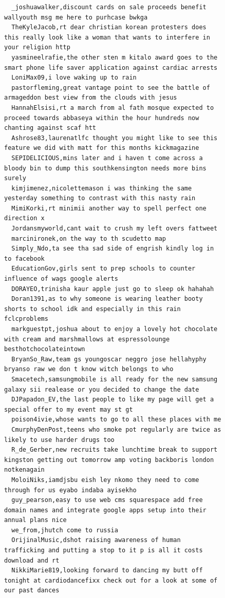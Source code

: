 \begin{figure}[htpb]
\begin{verbatim}
  _joshuawalker,discount cards on sale proceeds benefit wallyouth msg me here to purhcase bwkga
  TheKyleJacob,rt dear christian korean protesters does this really look like a woman that wants to interfere in your religion http
  yasmineelrafie,the other sten m kitalo award goes to the smart phone life saver application against cardiac arrests
  LoniMax09,i love waking up to rain
  pastorfleming,great vantage point to see the battle of armageddon best view from the clouds with jesus
  HannahElsisi,rt a march from al fath mosque expected to proceed towards abbaseya within the hour hundreds now chanting against scaf htt
  Ashrose83,laurenatlfc thought you might like to see this feature we did with matt for this months kickmagazine
  SEPIDELICIOUS,mins later and i haven t come across a bloody bin to dump this southkensington needs more bins surely
  kimjimenez,nicolettemason i was thinking the same yesterday something to contrast with this nasty rain
  MimiKorki,rt minimii another way to spell perfect one direction x
  Jordansmyworld,cant wait to crush my left overs fattweet
  marcinironek,on the way to th scudetto map
  Simply_Ndo,ta see tha sad side of engrish kindly log in to facebook
  EducationGov,girls sent to prep schools to counter influence of wags google alerts
  DORAYEO,trinisha kaur apple just go to sleep ok hahahah
  Doran1391,as to why someone is wearing leather booty shorts to school idk and especially in this rain fclcproblems
  markguestpt,joshua about to enjoy a lovely hot chocolate with cream and marshmallows at espressolounge besthotchocolateintown
  BryanSo_Raw,team gs youngoscar neggro jose hellahyphy bryanso raw we don t know witch belongs to who
  Smacetech,samsungmobile is all ready for the new samsung galaxy sii realease or you decided to change the date
  DJPapadon_EV,the last people to like my page will get a special offer to my event may st gt
  poison4ivie,whose wants to go to all these places with me
  CmurphyDenPost,teens who smoke pot regularly are twice as likely to use harder drugs too
  R_de_Gerber,new recruits take lunchtime break to support kingston getting out tomorrow amp voting backboris london notkenagain
  MoloiNiks,iamdjsbu eish ley nkomo they need to come through for us eyabo indaba ayisekho
  guy_pearson,easy to use web cms squarespace add free domain names and integrate google apps setup into their annual plans nice
  we_from,jhutch come to russia
  OrijinalMusic,dshot raising awareness of human trafficking and putting a stop to it p is all it costs download and rt
  NikkiMarie819,looking forward to dancing my butt off tonight at cardiodancefixx check out for a look at some of our past dances

\end{verbatim}
\end{figure}
